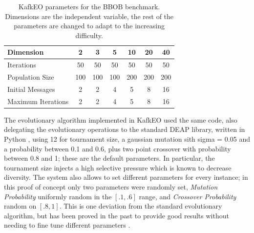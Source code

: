 \documentclass{llncs}
\begin{document}
  \begin{table}
    \small
    \caption{KafkEO parameters for the BBOB benchmark. Dimensions are 
    the independent variable, the rest of the parameters are changed to 
    adapt to the increasing difficulty. }
    \label{tab:params:kafka}
    \centering
    \small
    \begin{tabular}{|l|c|c|c|c|c|c|}
      \hline
      Dimension & 2 & 3 & 5 & 10 & 20 & 40\\ \hline
      Iterations & 50 & 50 & 50 & 50 & 50 & 50\\ \hline
      Population Size  & 100 & 100 & 100 & 200 & 200 & 200 \\ \hline
      Initial Messages & 2 & 2 & 4 & 5 & 8 & 16  \\ \hline
      Maximum Iterations & 2 & 2 & 4 & 5 & 8 & 16  \\ \hline
    \end{tabular}
  \end{table}

  The evolutionary algorithm implemented in KafkEO used the same code,
  also delegating the evolutionary operations to the standard DEAP
  library, written in
  Python \cite{fortin2012deap},
  using 12 for tournament size, a gaussian mutation sith sigma = 0.05 and a probability between 0.1 and 0.6, plus two point crossover with probability between 0.8 and 1; these are the default parameters.  
  In particular, the tournament size injects a high selective
  pressure which is known to decrease diversity. The system also allows
  to set different parameters for every instance; in this proof of concept
  only two parameters were randomly set, {\em Mutation Probability}
  uniformly random in the $[.1,.6]$ range, and {\em Crossover
    Probability} random on $[.8,1]$. This is one deviation from the
  standard evolutionary algorithm, but has been proved in the past to
  provide good results without needing to fine tune different
  parameters \cite{tanabe2013evaluation}.

\end{document}
